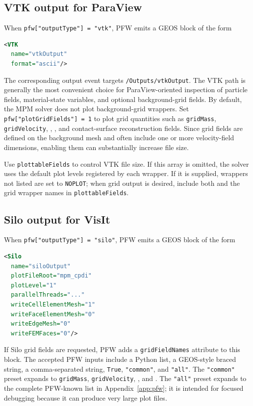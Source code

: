 \subsection{VTK output for ParaView}
\label{sec:pfw-vtk-output}

When \texttt{pfw["outputType"] = "vtk"}, PFW emits a GEOS block of the form
\begin{lstlisting}[language=XML,caption={Output block generated by PFW for VTK output.}]
<VTK
  name="vtkOutput"
  format="ascii"/>
\end{lstlisting}

The corresponding output event targets \texttt{/Outputs/vtkOutput}.  The VTK path is generally the most convenient choice for ParaView-oriented inspection of particle fields, material-state variables, and optional background-grid fields.  By default, the MPM solver does not plot background-grid wrappers.  Set \texttt{pfw["plotGridFields"] = 1} to plot grid quantities such as \texttt{gridMass}, \texttt{gridVelocity}, , , and contact-surface reconstruction fields.  Since grid fields are defined on the background mesh and often include one or more velocity-field dimensions, enabling them can substantially increase file size.

Use \texttt{plottableFields} to control VTK file size.  If this array is omitted, the solver uses the default plot levels registered by each wrapper.  If it is supplied, wrappers not listed are set to \texttt{NOPLOT}; when grid output is desired, include both  and the grid wrapper names in \texttt{plottableFields}.

\subsection{Silo output for VisIt}
\label{sec:pfw-silo-output}

When \texttt{pfw["outputType"] = "silo"}, PFW emits a GEOS block of the form
\begin{lstlisting}[language=XML,caption={Output block generated by PFW for Silo output.}]
<Silo
  name="siloOutput"
  plotFileRoot="mpm_cpdi"
  plotLevel="1"
  parallelThreads="..."
  writeCellElementMesh="1"
  writeFaceElementMesh="0"
  writeEdgeMesh="0"
  writeFEMFaces="0"/>
\end{lstlisting}

If Silo grid fields are requested, PFW adds a \texttt{gridFieldNames} attribute to this block.  The accepted PFW inputs include a Python list, a GEOS-style braced string, a comma-separated string, \texttt{True}, \texttt{"common"}, and \texttt{"all"}.  The \texttt{"common"} preset expands to \texttt{gridMass}, \texttt{gridVelocity}, , and .  The \texttt{"all"} preset expands to the complete PFW-known list in Appendix~\ref{app:pfw}; it is intended for focused debugging because it can produce very large plot files.

